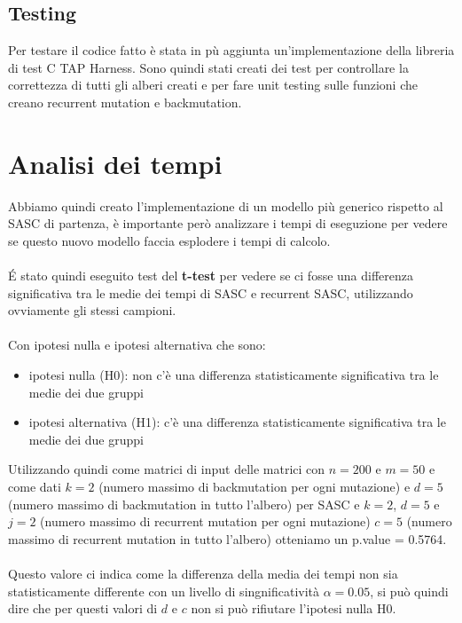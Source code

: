 \documentclass[12pt]{report}
\begin{document}
  \section{Testing}

  Per testare il codice fatto è stata in pù aggiunta un'implementazione della libreria di test C TAP Harness\cite{C-TAP}. Sono quindi stati creati dei test per controllare la correttezza di tutti gli alberi creati e per fare unit testing sulle funzioni che creano recurrent mutation e backmutation.

\chapter{Analisi dei tempi}

  Abbiamo quindi creato l'implementazione di un modello più generico rispetto al SASC di partenza, è importante però analizzare i tempi di eseguzione per vedere se questo nuovo modello faccia esplodere i tempi di calcolo.\\\\
  \'E stato quindi eseguito test del \textbf{t-test} per vedere se ci fosse una differenza significativa tra le medie dei tempi di SASC e recurrent SASC, utilizzando ovviamente gli stessi campioni.\\\\
  Con ipotesi nulla e ipotesi alternativa che sono:
  \begin{itemize}
    \item ipotesi nulla (H0): non c'è una differenza statisticamente significativa tra le medie dei due gruppi
    \item ipotesi alternativa (H1): c'è una differenza statisticamente significativa tra le medie dei due gruppi
  \end{itemize}
  Utilizzando quindi come matrici di input delle matrici con $n=200$ e $m=50$ e come dati $k=2$ (numero massimo di backmutation per ogni mutazione) e $d=5$ (numero massimo di backmutation in tutto l'albero) per SASC e $k=2$, $d=5$ e $j=2$ (numero massimo di recurrent mutation per ogni mutazione) $c=5$ (numero massimo di recurrent mutation in tutto l'albero) otteniamo un p.value = 0.5764.\\\\
  Questo valore ci indica come la differenza della media dei tempi non sia statisticamente differente con un livello di singnificatività $\alpha=0.05$, si può quindi dire che per questi valori di $d$ e $c$ non si può rifiutare l'ipotesi nulla H0.\\\\
\end{document}
